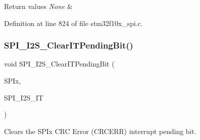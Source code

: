 \begin{DoxyRetVals}{Return values}
{\em None} & \\
\hline
\end{DoxyRetVals}


Definition at line 824 of file stm32f10x\+\_\+spi.\+c.

\mbox{\label{group___s_p_i___private___functions_ga35a524a49ff3d058137060f751e8749f}} 
\subsubsection{\texorpdfstring{S\+P\+I\+\_\+\+I2\+S\+\_\+\+Clear\+I\+T\+Pending\+Bit()}{SPI\_I2S\_ClearITPendingBit()}}
{\footnotesize\ttfamily void S\+P\+I\+\_\+\+I2\+S\+\_\+\+Clear\+I\+T\+Pending\+Bit (\begin{DoxyParamCaption}\item[{\hyperlink{struct_s_p_i___type_def}{S\+P\+I\+\_\+\+Type\+Def} $\ast$}]{S\+P\+Ix,  }\item[{uint8\+\_\+t}]{S\+P\+I\+\_\+\+I2\+S\+\_\+\+IT }\end{DoxyParamCaption})}



Clears the S\+P\+Ix C\+RC Error (C\+R\+C\+E\+RR) interrupt pending bit. 


